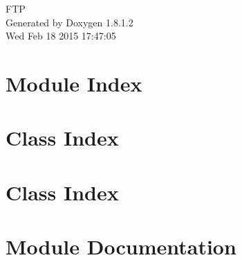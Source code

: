 \documentclass{book}
\begin{document}
\hypersetup{pageanchor=false,citecolor=blue}
\begin{titlepage}
\vspace*{7cm}
\begin{center}
{\Large F\-T\-P }\\
\vspace*{1cm}
{\large Generated by Doxygen 1.8.1.2}\\
\vspace*{0.5cm}
{\small Wed Feb 18 2015 17:47:05}\\
\end{center}
\end{titlepage}
\clearemptydoublepage
{}
\tableofcontents
\clearemptydoublepage
{}
\hypersetup{pageanchor=true,citecolor=blue}
\chapter{Module Index}

\chapter{Class Index}

\chapter{Class Index}

\chapter{Module Documentation}





\end{document}
